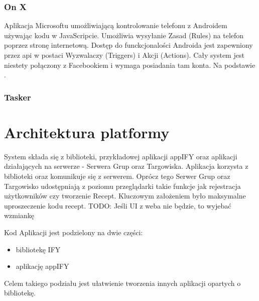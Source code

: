\documentclass[11pt,a4paper,polish,thesis]{dcsbook}
\begin{document}
\subsection{On X}
Aplikacja Microsoftu umożliwiającą kontrolowanie telefonu z Androidem używając kodu w JavaScripcie. Umożliwia wysyłanie Zasad (Rules) na telefon poprzez stronę internetową. Dostęp do funckcjonalości Androida jest zapewniony przez api w postaci Wyzwalaczy (Triggers) i Akcji (Actions). Cały system jest niestety połączony z Facebookiem i wymaga posiadania tam konta.
Na podstawie \cite{onx}.
\subsection{Tasker}

\chapter{Architektura platformy}
System składa się z biblioteki, przykładowej aplikacji appIFY oraz aplikacji działających na serwerze - Serwera Grup oraz Targowiska.
Aplikacja korzysta z biblioteki oraz komunikuje się z serwerem. Oprócz tego Serwer Grup oraz Targowisko udostępniają z poziomu przeglądarki takie funkcje jak rejestracja użytkowników czy tworzenie Recept. Kluczowym założeniem było maksymalne uproszeczenie kodu recept. 
TODO: Jeśli UI z weba nie będzie, to wyjebać wzmiankę

Kod Aplikacji jest podzielony na dwie części:
\begin{itemize}
\item bibliotekę IFY
\item aplikację appIFY
\end{itemize}
Celem takiego podziału jest ułatwienie tworzenia innych aplikacji opartych o bibliotekę.
\end{document}
